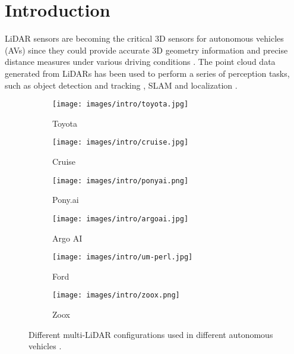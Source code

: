 \documentclass[10pt,twocolumn,letterpaper]{article}
\begin{document}
\section{Introduction}
\label{sec:intro}
LiDAR sensors are becoming the critical 3D sensors for autonomous vehicles (AVs) since they could provide accurate 3D geometry information and precise distance measures under various driving conditions \cite{liu2019lpd, 9635878}. The point cloud data generated from LiDARs has been used to perform a series of perception tasks, such as object detection and tracking \cite{shi2021pv, shi2020points, shi2019pointrcnn}, SLAM and localization \cite{zhang2014loam,lu2019deepvcp,yu2018ds}.
\begin{figure}[h]
\begin{center}
    \begin{subfigure}[b]{0.22\textwidth}
                \texttt{[image: images/intro/toyota.jpg]}
                \caption{Toyota}
                \label{fig:toyota}
    \end{subfigure}
    \begin{subfigure}[b]{0.22\textwidth}
                \texttt{[image: images/intro/cruise.jpg]}
                \caption{Cruise}
                \label{fig:cruise}
    \end{subfigure}

    \begin{subfigure}[b]{0.22\textwidth}
                \texttt{[image: images/intro/ponyai.png]}
                \caption{Pony.ai}
                \label{fig:ponyai}
    \end{subfigure}
    \begin{subfigure}[b]{0.22\textwidth}
                \texttt{[image: images/intro/argoai.jpg]}
                \caption{Argo AI}
                \label{fig:argoai}
    \end{subfigure}%

    \begin{subfigure}[b]{0.22\textwidth}
                \texttt{[image: images/intro/um-perl.jpg]}
                \caption{Ford}
                \label{fig:ford}
    \end{subfigure}
    \begin{subfigure}[b]{0.22\textwidth}
                \texttt{[image: images/intro/zoox.png]}
                \caption{Zoox}
                \label{fig:zoox}
    \end{subfigure}
\end{center}
\vspace{-8mm}
  \caption{Different multi-LiDAR configurations used in different autonomous vehicles \cite{toyota,cruise,ponyai,argoai,ford,zoox}.}
\label{fig:baseline-config}
\vspace{-6mm}
\end{figure}
\end{document}
